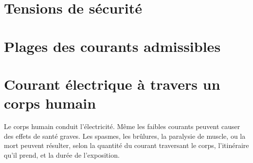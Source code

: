 \section{Tensions de sécurité}

\section{Plages des courants admissibles}

\section{Courant électrique à travers un corps humain}

Le corps humain conduit l'électricité. Même les faibles courants peuvent causer des effets de santé graves. Les spasmes, les brûlures, la paralysie de muscle, ou la mort peuvent résulter, selon la quantité du courant traversant le corps, l'itinéraire qu'il prend, et la durée de l'exposition.\\
